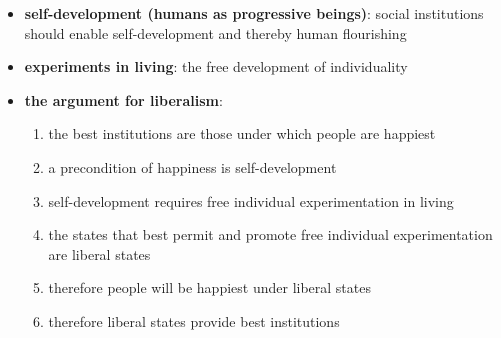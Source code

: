\begin{itemize}
	\item \textbf{self-development (humans as progressive beings)}: social
	 institutions should enable self-development and thereby human
	 flourishing
	\item \textbf{experiments in living}: the free development of
	 individuality
	\item \textbf{the argument for liberalism}:
	 \begin{enumerate}
	 	\item the best institutions are those under which people are
		 happiest
		\item a precondition of happiness is self-development
		\item self-development requires free individual experimentation
		 in living
		\item the states that best permit and promote free individual
		 experimentation are liberal states
		\item therefore people will be happiest under liberal states
		\item therefore liberal states provide best institutions
	 \end{enumerate}
\end{itemize}
